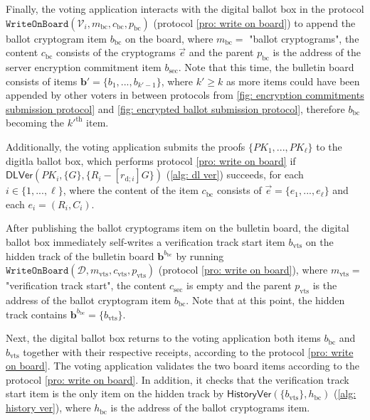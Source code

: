 Finally, the voting application interacts with the digital ballot box in the protocol $\mathtt{WriteOnBoard}(\mathcal{V}_i, m_\mathrm{bc}, c_\mathrm{bc}, p_\mathrm{bc})$ (protocol \ref{pro: write on board}) to append the ballot cryptogram item $b_\mathrm{bc}$ on the board, where $m_\mathrm{bc} =$ "ballot cryptograms", the content $c_\mathrm{bc}$ consists of the cryptograms $\vec{e}$ and the parent $p_\mathrm{bc}$ is the address of the server encryption commitment item $b_\mathrm{sec}$. Note that this time, the bulletin board consists of items $\boldsymbol{b'} = \{ b_1, ..., b_{k'-1} \}$, where $k' \geq k$ as more items could have been appended by other voters in between protocols from \cref{fig: encryption commitments submission protocol} and \cref{fig: encrypted ballot submission protocol}, therefore $b_\mathrm{bc}$ becoming the ${k'}^\mathrm{th}$ item.

Additionally, the voting application submits the proofs $\{ PK_1, ..., PK_\ell \}$ to the digitla ballot box, which performs protocol \ref{pro: write on board} if $\mathsf{DLVer}(PK_i, \{ G \}, \{ R_i - [r_{\mathrm{d}; i}]G \})$ (\cref{alg: dl ver}) succeeds, for each $i \in \{ 1, ..., \ell \}$, where the content of the item  $c_\mathrm{bc}$ consists of $\vec{e} = \{ e_1, ..., e_\ell \}$ and each $ e_i = (R_i, C_i)$.

After publishing the ballot cryptograms item on the bulletin board, the digital ballot box immediately self-writes a verification track start item $b_\mathrm{vts}$ on the hidden track of the bulletin board $\boldsymbol{b}^{b_\mathrm{bc}}$ by running $\mathtt{WriteOnBoard}(\mathcal{D}, m_\mathrm{vts}, c_\mathrm{vts}, p_\mathrm{vts})$ (protocol \ref{pro: write on board}), where $m_\mathrm{vts} =$ "verification track start", the content $c_\mathrm{sec}$ is empty and the parent $p_\mathrm{vts}$ is the address of the ballot cryptogram item $b_\mathrm{bc}$. Note that at this point, the hidden track contains $\boldsymbol{b}^{b_\mathrm{bc}} = \{ b_\mathrm{vts} \}$.

Next, the digital ballot box returns to the voting application both items $b_\mathrm{bc}$ and $b_\mathrm{vts}$ together with their respective receipts, according to the protocol \ref{pro: write on board}. The voting application validates the two board items according to the protocol \ref{pro: write on board}. In addition, it checks that the verification track start item is the only item on the hidden track by $\mathsf{HistoryVer}(\{ b_\mathrm{vts} \}, h_\mathrm{bc})$ (\cref{alg: history ver}), where $h_\mathrm{bc}$ is the address of the ballot cryptograms item.

